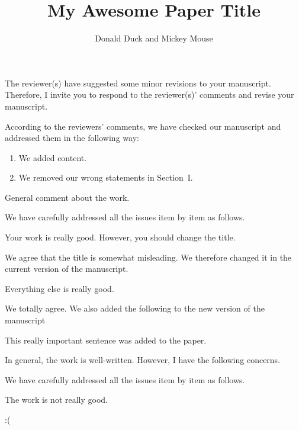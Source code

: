 \documentclass[12pt,USenglish]{scrartcl}
\title{My Awesome Paper Title}
\author{Donald Duck and Mickey Mouse}
\begin{document}
\printtitlepage


\editor
\begin{generalcomment}
	The reviewer(s) have suggested some minor revisions to your manuscript. Therefore, I invite you to respond to the reviewer(s)' comments and revise your manuscript.
\end{generalcomment}
\begin{revresponse}
	According to the reviewers' comments, we have checked our manuscript and addressed them in the following way:
	\begin{enumerate}
		\item We added content.
		\item We removed our wrong statements in Section~I.
	\end{enumerate}
\end{revresponse}



\reviewer
\begin{generalcomment}
	General comment about the work.
\end{generalcomment}
\begin{revresponse}
	We have carefully addressed all the issues item by item as follows.
\end{revresponse}

\begin{revcomment}
	Your work is really good. However, you should change the title.
\end{revcomment}
\begin{revresponse}
	We agree that the title is somewhat misleading. We therefore changed it in the current version of the manuscript.
\end{revresponse}

\begin{revcomment}
	Everything else is really good.
\end{revcomment}
\begin{revresponse}
	We totally agree. We also added the following to the new version of the manuscript
	\begin{change}
		This really important sentence was added to the paper.
	\end{change}
\end{revresponse}

\reviewer
\begin{generalcomment}
	In general, the work is well-written. However, I have the following concerns.
\end{generalcomment}
\begin{revresponse}
	We have carefully addressed all the issues item by item as follows.
\end{revresponse}

\begin{revcomment}
	The work is not really good.
\end{revcomment}
\begin{revresponse}
	:(
\end{revresponse}
\end{document}
